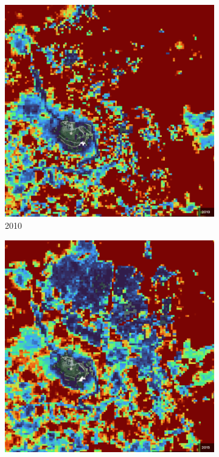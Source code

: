 \begin{figure}[H]
\begin{subfigure}[t]{0.24\textwidth}
        \includegraphics[width=\linewidth,height=\linewidth]{figs_06/brocken_2010.png}
        \caption{2010}
        \end{subfigure}
        \hfill
        \begin{subfigure}[t]{0.24\textwidth}
        \centering
        \includegraphics[width=\linewidth,height=\linewidth]{figs_06/brocken_2015.png}

\end{subfigure}
\end{figure}
